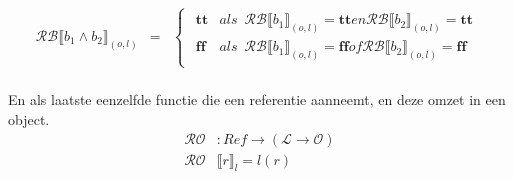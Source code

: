 \documentclass[12pt]{article}
\newcommand{\RB}{\mathcal{RB}}
\newcommand{\RO}{\mathcal{RO}}
\begin{document}
\[\begin{matrix}
\RB \llbracket b_1 \wedge b_2 \rrbracket_{(o,l)} & = &
\begin{cases}
\begin{matrix}
\boldsymbol{tt} & als \enspace \RB\llbracket b_1 \rrbracket_{(o,l)} = \boldsymbol{tt} en \RB \llbracket b_2 \rrbracket_{(o,l)} = \boldsymbol{tt}\\
\boldsymbol{ff} & als \enspace \RB\llbracket b_1 \rrbracket_{(o,l)} = \boldsymbol{ff} of \RB \llbracket b_2 \rrbracket_{(o,l)} = \boldsymbol{ff}
\end{matrix}
\end{cases}\\

\end{matrix}
\]

En als laatste eenzelfde functie die een referentie aanneemt, en deze omzet in een object.
\begin{align*} 
\RO& : Ref \rightarrow ( \mathcal{L} \rightarrow \mathcal{O}) \\
\RO& \llbracket r \rrbracket_l  =  l(r)
\end{align*}
\end{document}
